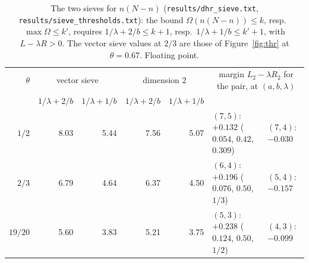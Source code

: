 ﻿\documentclass[11pt]{amsart}
\theoremstyle{remark}
\begin{document}
\begin{table}[H]
\centering
\footnotesize
\setlength{\tabcolsep}{4pt}
\begin{tabular}{r|rr|rr|ll}
\hline
$\theta$ & \multicolumn{2}{c|}{vector sieve} & \multicolumn{2}{c|}{dimension $2$} & \multicolumn{2}{c}{margin $L_2-\lambda R_2$ for the pair, at $(a,b,\lambda)$}\\
 & $1/\lambda+2/b$ & $1/\lambda+1/b$ & $1/\lambda+2/b$ & $1/\lambda+1/b$ & & \\
\hline
$1/2$ & 8.03 & 5.44 & 7.56 & 5.07 & $(7,5)$: $+0.132$ ($0.054$, $0.42$, $0.309$) & $(7,4)$: $-0.030$\\
$2/3$ & 6.79 & 4.64 & 6.37 & 4.50 & $(6,4)$: $+0.196$ ($0.076$, $0.50$, $1/3$) & $(5,4)$: $-0.157$\\
$19/20$ & 5.60 & 3.83 & 5.21 & 3.75 & $(5,3)$: $+0.238$ ($0.124$, $0.50$, $1/2$) & $(4,3)$: $-0.099$\\
\hline
\end{tabular}
\medskip
\caption{The two sieves for $n(N-n)$ (\texttt{results/dhr\_sieve.txt}, \texttt{results/sieve\_thresholds.txt}): the bound $\Omega(n(N-n))\le k$, resp.\ $\max\Omega\le k'$, requires $1/\lambda+2/b\le k+1$, resp.\ $1/\lambda+1/b\le k'+1$, with $L-\lambda R>0$. The vector sieve values at $2/3$ are those of Figure~\ref{fig:thr} at $\theta=0.67$. Floating point.}
\label{tab:dim2}
\end{table}
\end{document}
